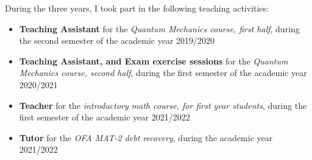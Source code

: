 During the three years, I took part in the following teaching activities:

\begin{itemize}
    \item \textbf{Teaching Assistant} for the \textit{Quantum Mechanics course,
        first half}, during the second semester of the academic year 2019/2020
    \item \textbf{Teaching Assistant, and Exam exercise sessions} for the
        \textit{Quantum Mechanics course, second half}, during the first
        semester of the academic year 2020/2021
    \item \textbf{Teacher} for the \textit{introductory math course, for first
        year students}, during the first semester of the academic year
        2021/2022
    \item \textbf{Tutor} for the \textit{OFA MAT-2 debt recovery}, during the
        academic year 2021/2022
\end{itemize}
